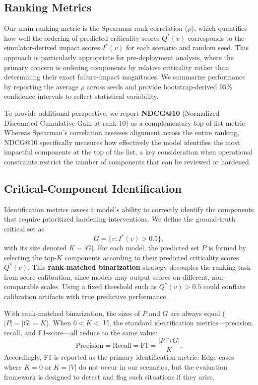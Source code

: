 \documentclass[sigconf,9pt,anonymous]{acmart}
\begin{document}
\subsection{Ranking Metrics}

Our main ranking metric is the Spearman rank correlation ($\rho$), which quantifies how well the ordering of predicted criticality scores $Q^*(v)$ corresponds to the simulator-derived impact scores $I^*(v)$ for each scenario and random seed. This approach is particularly appropriate for pre-deployment analysis, where the primary concern is ordering components by relative criticality rather than determining their exact failure-impact magnitudes. We summarize performance by reporting the average $\rho$ across seeds and provide bootstrap-derived $95\%$ confidence intervals to reflect statistical variability.

To provide additional perspective, we report \textbf{NDCG@10} (Normalized Discounted Cumulative Gain at rank 10) as a complementary top-of-list metric. Whereas Spearman's correlation assesses alignment across the entire ranking, NDCG@10 specifically measures how effectively the model identifies the most impactful components at the top of the list, a key consideration when operational constraints restrict the number of components that can be reviewed or hardened.

\subsection{Critical-Component Identification}

Identification metrics assess a model’s ability to correctly identify the components that require prioritized hardening interventions. We define the ground-truth critical set as
\[
G = \{v : I^*(v) > 0.5\},
\]
with its size denoted $K=|G|$. For each model, the predicted set $P$ is formed by selecting the top-$K$ components according to their predicted criticality scores $Q^*(v)$. This \textbf{rank-matched binarization} strategy decouples the ranking task from score calibration, since models may output scores on different, non-comparable scales. Using a fixed threshold such as $Q^*(v)>0.5$ could conflate calibration artifacts with true predictive performance.

With rank-matched binarization, the sizes of $P$ and $G$ are always equal ($|P|=|G|=K$). When $0<K<|V|$, the standard identification metrics—precision, recall, and F1-score—all reduce to the same value:
\[
\text{Precision}=\text{Recall}=\text{F1}=\frac{|P\cap G|}{K}.
\]
Accordingly, F1 is reported as the primary identification metric. Edge cases where $K=0$ or $K=|V|$ do not occur in our scenarios, but the evaluation framework is designed to detect and flag such situations if they arise.
\end{document}
